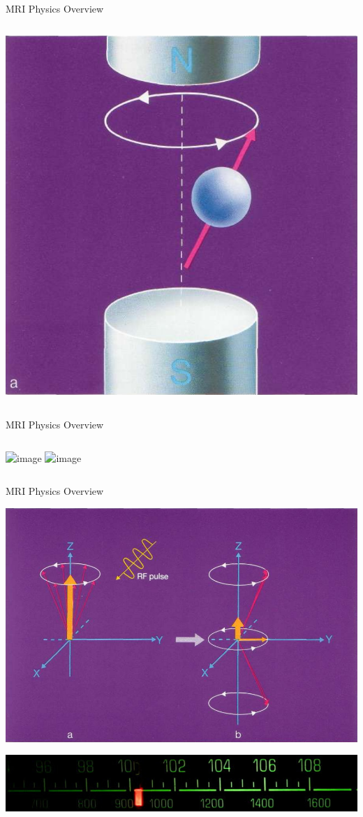 \documentclass[aspectratio=169,xcolor=dvipsnames]{beamer}
\begin{document}
\begin{frame}{MRI Physics Overview}
\begin{columns}[c]
\includegraphics[width=1\textwidth]{imgs/precession2}
\end{columns}
\end{frame}


\begin{frame}{MRI Physics Overview}
\begin{columns}[c]
\includegraphics<1->[width=1\textwidth]{imgs/cancel}
\includegraphics<2->[width=1\textwidth]{imgs/cancel2}
\end{columns}
\end{frame}


\begin{frame}{MRI Physics Overview}
\begin{center}
\includegraphics[width=.6\textwidth]{imgs/rfpulse}

\includegraphics[width=.6\textwidth]{imgs/fmdial}
\end{center}
\end{frame}
\end{document}
